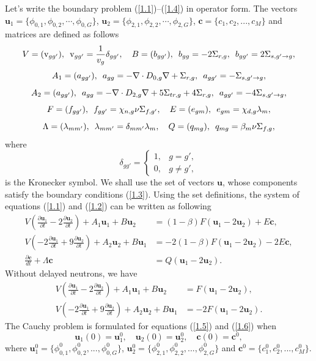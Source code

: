 \documentclass[authoryear]{elsarticle}
\begin{document}
Let's write the boundary problem (\ref{1.1})--(\ref{1.4}) in operator form. 
The vectors $\bm u_1 = \{\phi_{0,1}, \phi_{0,2}, \cdots, \phi_{0,G}\}$, $\bm u_2 = \{\phi_{2,1}, \phi_{2,2}, \cdots, \phi_{2,G}\}$, $\bm c = \{c_1, c_2, ..., c_M\}$ and matrices are defined as follows
\[
V = (\mathrm{v}_{gg'}),
\enskip
\mathrm{v}_{gg'} = \frac{1}{v_g} \delta_{gg'},
\quad
B = (b_{gg'}),
\enskip
b_{gg} = -2\Sigma_{r,g},
\enskip
b_{gg'} = 2\Sigma_{s, g' \rightarrow g},
\]
\[
A_1 = (a_{gg'}),
\enskip
a_{gg} = -\nabla \cdot D_{0,g} \nabla + \Sigma_{r,g},
\enskip
a_{gg'} = -\Sigma_{s, g' \rightarrow g},
\]
\[
A_2 = (a_{gg'}),
\enskip
a_{gg} = -\nabla \cdot D_{2,g} \nabla + 5\Sigma_{tr,g} + 4\Sigma_{r,g},
\enskip
a_{gg'} = -4\Sigma_{s, g' \rightarrow g},
\]
\[
F = (f_{gg'}),
\enskip
f_{gg'} = \chi_{n,g}\nu\Sigma_{f,g'},
\quad
E =(e_{gm}),
\enskip
e_{gm} = \chi_{d,g}\lambda_m,
\]
\[
\Lambda = (\lambda_{mm'}), 
\enskip
\lambda_{mm'} = \delta_{mm'}\lambda_m,
\quad
Q = (q_{mg}),
\enskip
q_{mg} =\beta_m \nu\Sigma_{f,g},
\]
where
\[
 \delta_{g g'} = \left \{ 
 \begin{matrix}
 1, & g = g', \\
 0, & g \neq  g',
 \end{matrix}
 \right. 
\]  
is the Kronecker symbol.
We shall use the set of vectors $\bm u$, whose components satisfy the boundary conditions (\ref{1.3}). 
Using the set definitions, the system of equations (\ref{1.1}) and (\ref{1.2}) can be written as following
\begin{equation}\label{1.5}
\begin{split}
V (\frac{\partial \bm u_1}{\partial t} - 2 \frac{\partial \bm u_2}{\partial t}) + A_1 \bm u_1 + B \bm u_2 &=(1-\beta) F (\bm u_1 - 2\bm u_2) + E\bm c,
\\
V(- 2 \frac{\partial \bm u_1}{\partial t} + 9 \frac{\partial \bm u_2}{\partial t} ) + A_2 \bm u_2 + B \bm u_1 &=-2(1-\beta) F (\bm u_1 - 2\bm u_2) - 2E\bm c,
\\
\frac{\partial \bm c}{d t} + \Lambda \bm c &= Q (\bm u_1 - 2\bm u_2). 
\end{split}
\end{equation}
Without delayed neutrons, we have
\begin{equation}\label{1.6}
\begin{split}
V (\frac{\partial \bm u_1}{\partial t} - 2 \frac{\partial \bm u_2}{\partial t}) + A_1 \bm u_1 + B \bm u_2 &= F (\bm u_1 - 2\bm u_2),
\\
V( - 2 \frac{\partial \bm u_1}{\partial t} + 9 \frac{\partial \bm u_2}{\partial t}) + A_2 \bm u_2 + B \bm u_1 &=-2 F (\bm u_1 - 2\bm u_2).
\end{split}
\end{equation}
The Cauchy problem is formulated for equations (\ref{1.5}) and (\ref{1.6}) when
\begin{equation}\label{1.7}
 \bm u_1(0) = \bm u_1^0, \quad  \bm u_2(0) = \bm u_2^0, \quad \bm c(0) = \bm c^0,
\end{equation} 
where $\bm u_1^0 = \{\phi_{0,1}^0,  \phi_{0,2}^0, ...,  \phi_{0,G}^0 \}$, 
$\bm u_2^0 = \{\phi_{2,1}^0,  \phi_{2,2}^0, ...,  \phi_{2,G}^0 \}$ and 
$\bm c^0 = \{ c_1^0,  c_2^0, ...,  c_M^0 \}$.
\end{document}
